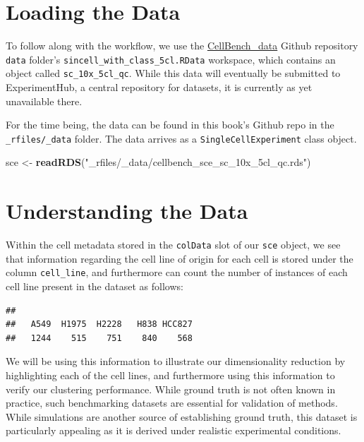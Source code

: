 \documentclass[]{book}
\newenvironment{Shaded}{\begin{snugshade}}{\end{snugshade}}
\newcommand{\KeywordTok}[1]{\textcolor[rgb]{0.13,0.29,0.53}{\textbf{#1}}}
\newcommand{\NormalTok}[1]{#1}
\newcommand{\OperatorTok}[1]{\textcolor[rgb]{0.81,0.36,0.00}{\textbf{#1}}}
\newcommand{\StringTok}[1]{\textcolor[rgb]{0.31,0.60,0.02}{#1}}
\begin{document}
\hypertarget{loading-the-data-1}{%
\section{Loading the Data}\label{loading-the-data-1}}

To follow along with the workflow, we use the \href{https://github.com/LuyiTian/CellBench_data}{CellBench\_data} Github repository \texttt{data} folder's \texttt{sincell\_with\_class\_5cl.RData} workspace, which contains an object called \texttt{sc\_10x\_5cl\_qc}. While this data will eventually be submitted to ExperimentHub, a central repository for datasets, it is currently as yet unavailable there.

For the time being, the data can be found in this book's Github repo in the \texttt{\_rfiles/\_data} folder. The data arrives as a \texttt{SingleCellExperiment} class object.

\begin{Shaded}
\begin{Highlighting}[]
\NormalTok{sce <-}\StringTok{ }\KeywordTok{readRDS}\NormalTok{(}\StringTok{"_rfiles/_data/cellbench_sce_sc_10x_5cl_qc.rds"}\NormalTok{)}
\end{Highlighting}
\end{Shaded}

\hypertarget{understanding-the-data}{%
\section{Understanding the Data}\label{understanding-the-data}}

Within the cell metadata stored in the \texttt{colData} slot of our \texttt{sce} object, we see that information regarding the cell line of origin for each cell is stored under the column \texttt{cell\_line}, and furthermore can count the number of instances of each cell line present in the dataset as follows:

\begin{Shaded}
\end{Shaded}

\begin{verbatim}
## 
##   A549  H1975  H2228   H838 HCC827 
##   1244    515    751    840    568
\end{verbatim}

We will be using this information to illustrate our dimensionality reduction by highlighting each of the cell lines, and furthermore using this information to verify our clustering performance. While ground truth is not often known in practice, such benchmarking datasets are essential for validation of methods. While simulations are another source of establishing ground truth, this dataset is particularly appealing as it is derived under realistic experimental conditions.
\end{document}
